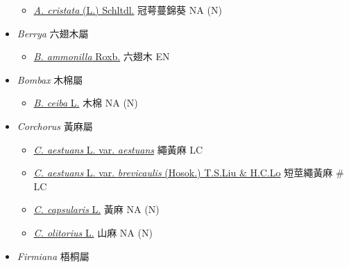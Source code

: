 \begin{itemize}
  \begin{itemize}
        \item[] \href{http://www.theplantlist.org/tpl1.1/search?q=Anoda+cristata}{\textit{A. cristata} (L.) Schltdl.}   冠萼蔓錦葵   NA (N)
  \end{itemize}
 \item[] \textit{Berrya} 六翅木屬
                                
  \begin{itemize}
        \item[] \href{http://www.theplantlist.org/tpl1.1/search?q=Berrya+ammonilla}{\textit{B. ammonilla} Roxb.}   六翅木   EN
  \end{itemize}
 \item[] \textit{Bombax} 木棉屬
                                
  \begin{itemize}
        \item[] \href{http://www.theplantlist.org/tpl1.1/search?q=Bombax+ceiba}{\textit{B. ceiba} L.}   木棉   NA (N)
  \end{itemize}
 \item[] \textit{Corchorus} 黃麻屬
                                
  \begin{itemize}
        \item[] \href{http://www.theplantlist.org/tpl1.1/search?q=Corchorus+aestuans+var.+aestuans}{\textit{C. aestuans} L. var. \textit{aestuans}}   繩黃麻   LC
        \item[] \href{http://www.theplantlist.org/tpl1.1/search?q=Corchorus+aestuans+var.+brevicaulis}{\textit{C. aestuans} L. var. \textit{brevicaulis} (Hosok.) T.S.Liu \& H.C.Lo}   短莖繩黃麻  \# LC
        \item[] \href{http://www.theplantlist.org/tpl1.1/search?q=Corchorus+capsularis}{\textit{C. capsularis} L.}   黃麻   NA (N)
        \item[] \href{http://www.theplantlist.org/tpl1.1/search?q=Corchorus+olitorius}{\textit{C. olitorius} L.}   山麻   NA (N)
  \end{itemize}
 \item[] \textit{Firmiana} 梧桐屬
                                

\end{itemize}
